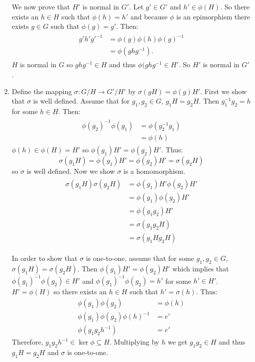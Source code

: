 \documentclass[paper=a4, fontsize=11pt]{jhwhw} %
\begin{document}
\begin{enumerate}
        We now prove that $H'$ is normal in $G'$.
        Let $g'\in G'$ and $h'\in \phi(H)$. So there exists an $h\in H$ such that $\phi(h) = h'$ and because $\phi$ is an epimorphism there exists $g\in G$ such that $\phi(g) = g'$. Then:
        \begin{align}
            \begin{split}
                g'h'g'^{-1} &= \phi(g)\phi(h)\phi(g)^{-1}\\
                            &= \phi(ghg^{-1}).
            \end{split}
        \end{align}
        $H$ is normal in $G$ so $ghg^{-1}\in H$ and thus $\phi(ghg^{-1}\in H'$. So $H'$ is normal in $G'$.
    \item
        Define the mapping $\sigma: G/H\to G'/H'$ by $\sigma(gH) = \phi(g)H'$. First we show that $\sigma$ is well defined. Assume that for $g_1, g_2\in G$, $g_1H = g_2H$. Then $g_1^{-1}g_2 = h$ for some $h\in H$. Then:
        \begin{align}
            \begin{split}
                \phi(g_2)^{-1}\phi(g_1) &= \phi(g_2^{-1}g_1)\\
                                        &= \phi(h)
            \end{split}
        \end{align}
        $\phi(h)\in \phi(H) = H'$ so $\phi(g_1)H' = \phi(g_2)H'$. Thus:
        $$\sigma(g_1H) = \phi(g_1)H' = \phi(g_2)H' = \sigma(g_2H)$$
        so $\sigma$ is well defined. Now we show $\sigma$ is a homomorphism.
        \begin{align}
            \begin{split}
                \sigma(g_1H)\sigma(g_2H) &= \phi(g_1)H'\phi(g_2)H'\\
                                         &= \phi(g_1)\phi(g_2)H'\\
                                         &= \phi(g_1g_2)H'\\
                                         &= \sigma(g_1g_2H)\\
                                         &= \sigma(g_1Hg_2H)
            \end{split}
        \end{align}

        In order to show that $\sigma$ is one-to-one, assume that for some $g_1, g_2\in G$, $\sigma(g_1H) = \sigma(g_2H)$. Then $\phi(g_1)H' = \phi(g_2)H'$ which implies that $\phi(g_1)^{-1}\phi(g_2) \in H'$ and $\phi(g_1)^{-1}\phi(g_2) = h'$ for some $h'\in H'$. $H' = \phi(H)$ so there exists an $h\in H$ such that $h' = \sigma(h)$. Thus:
        \begin{align}
            \phi(g_1)\phi(g_2) &= \phi(h)\\
            \phi(g_1)\phi(g_2)\phi(h)^{-1} &= e'\\
            \phi(g_1g_2h^{-1}) &= e'
        \end{align}
        Therefore, $g_1g_2h^{-1}\in \ker\phi\subseteq H$. Multiplying by $h$ we get $g_1g_2\in H$ and thus $g_1H = g_2H$ and $\sigma$ is one-to-one.
        

\end{enumerate}
\end{document}
